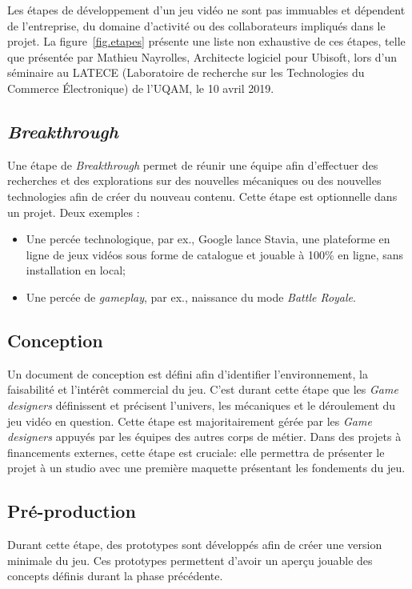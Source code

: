 Les étapes de développement d'un jeu vidéo ne sont pas immuables et dépendent de l'entreprise, du domaine d'activité ou des collaborateurs impliqués dans le projet.
La figure~\ref{fig.etapes} présente une liste non exhaustive de ces étapes, telle que présentée par Mathieu Nayrolles, Architecte logiciel pour Ubisoft, lors d’un séminaire au LATECE (Laboratoire de recherche sur les Technologies du Commerce Électronique) de l’UQAM, le 10 avril 2019.



\subsection{\emph{Breakthrough}}

Une étape de \emph{Breakthrough} permet de réunir une équipe afin d'effectuer des recherches et des explorations sur des nouvelles mécaniques ou des nouvelles technologies afin de créer du nouveau contenu.
Cette étape est optionnelle dans un projet.
Deux exemples :
\begin{itemize}
    \item Une percée technologique, par ex., Google lance Stavia, une plateforme en ligne de jeux vidéos sous forme de catalogue et jouable à 100\% en ligne, sans installation en local;
    \item Une percée de \emph{gameplay}, par ex., naissance du mode \emph{Battle Royale}.
\end{itemize}

\subsection{Conception}

Un document de conception est défini afin d'identifier l'environnement, la faisabilité et l'intérêt commercial du jeu.
C'est durant cette étape que les \emph{Game designers} définissent et précisent l'univers, les mécaniques et le déroulement du jeu vidéo en question.
Cette étape est majoritairement gérée par les \emph{Game designers} appuyés par les équipes des autres corps de métier.
Dans des projets à financements externes, cette étape est cruciale: elle permettra de présenter le projet à un studio avec une première maquette présentant les fondements du jeu.

\subsection{Pré-production}
Durant cette étape, des prototypes sont développés afin de créer une version minimale du jeu.
Ces prototypes permettent d'avoir un aperçu jouable des concepts définis durant la phase précédente. 

